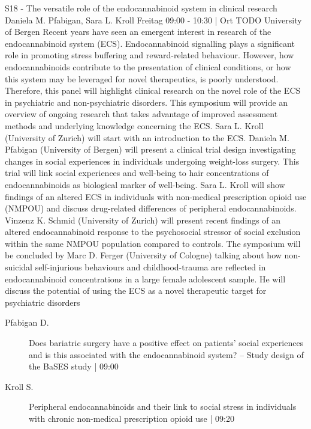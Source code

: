 
            \begin{symposium}
            {S18 - The versatile role of the endocannabinoid system in clinical research}
            {Daniela M. Pfabigan, Sara L. Kroll}
            {Freitag 09:00 - 10:30 | Ort TODO}
            {University of Bergen}
            Recent years have seen an emergent interest in research of the endocannabinoid system (ECS). Endocannabinoid signalling plays a significant role in promoting stress buffering and reward-related behaviour. However, how endocannabinoids contribute to the presentation of clinical conditions, or how this system may be leveraged for novel therapeutics, is poorly understood. Therefore, this panel will highlight clinical research on the novel role of the ECS in psychiatric and non-psychiatric disorders.
This symposium will provide an overview of ongoing research that takes advantage of improved assessment methods and underlying knowledge concerning the ECS. Sara L. Kroll (University of Zurich) will start with an introduction to the ECS. Daniela M. Pfabigan (University of Bergen) will present a clinical trial design investigating changes in social experiences in individuals undergoing weight-loss surgery. This trial will link social experiences and well-being to hair concentrations of endocannabinoids as biological marker of well-being. Sara L. Kroll will show findings of an altered ECS in individuals with non-medical prescription opioid use (NMPOU) and discuss drug-related differences of peripheral endocannabinoids. Vinzenz K. Schmid (University of Zurich) will present recent findings of an altered endocannabinoid response to the psychosocial stressor of social exclusion within the same NMPOU population compared to controls. The symposium will be concluded by Marc D. Ferger (University of Cologne) talking about how non-suicidal self-injurious behaviours and childhood-trauma are reflected in endocannabinoid concentrations in a large female adolescent sample. He will discuss the potential of using the ECS as a novel therapeutic target for psychiatric disorders
            \begin{description}    
            
                \item [ Pfabigan D.] Does bariatric surgery have a positive effect on patients’ social experiences and is this associated with the endocannabinoid system? – Study design of the BaSES study \textcolor{mygray}{ | 09:00}    
                
                \item [ Kroll S.] Peripheral endocannabinoids and their link to social stress in individuals with chronic non-medical prescription opioid use \textcolor{mygray}{ | 09:20}    
                

\end{description}
\end{symposium}
